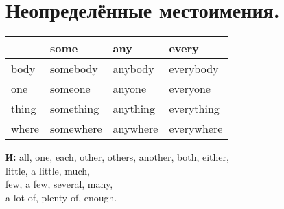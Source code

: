 \documentclass[oneside]{book}
\begin{document}
	\section{Неопределённые местоимения.}
	\begin{center}
		\begin{tabular}{|l|l|l|l|}
		\hline
			  & some      & any      & every      \\ \hline
		body  & somebody  & anybody  & everybody  \\ \hline
		one   & someone   & anyone   & everyone   \\ \hline
		thing & something & anything & everything \\ \hline
		where & somewhere & anywhere & everywhere \\ \hline
		\end{tabular}
	\end{center}

	\textbf{И:} all, one, each, other, others, another,
	both, either,
	\\
	little, a little, much,
	\\
	few, a few, several, many,
	\\
	a lot of, plenty of, enough.
\end{document}
